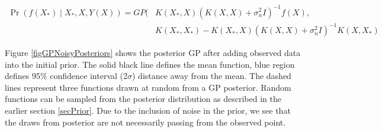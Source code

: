   \begin{equation}\label{eqNoisyPredictiveGP}
  \begin{aligned}
      \Pr(f(X_{*}) \mid X_{*}, X, Y(X)) = GP(  & K(X_{*}, X)( K(X, X) + \sigma^{2}_{n}I)^{-1}f(X),   \\ 
                                & K(X_{*}, X_{*}) - K(X_{*}, X)( K(X, X) + \sigma^{2}_{n}I)^{-1} K(X, X_{*}) 
  \end{aligned}
  \end{equation}

Figure \ref{figGPNoisyPosteriors} shows the posterior GP after adding observed data into the initial prior. The solid black line defines the mean function, blue region defines 95\% confidence interval (2$\sigma$) distance away from the mean. The dashed lines represent three functions drawn at random from a GP posterior. Random functions can be sampled from the posterior distribution as described in the earlier section \ref{secPrior}.  Due to the inclusion of noise in the prior, we see that the draws from posterior are not necessarily passing from the observed point.

